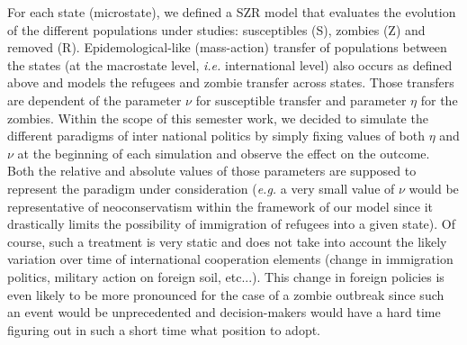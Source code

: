 \documentclass[11pt]{article} %
\begin{document}
For each state (microstate), we defined a SZR model that evaluates the evolution of the different populations under studies: susceptibles (S), zombies (Z) and removed (R). Epidemological-like (mass-action) transfer of populations between the states (at the macrostate level, \textit{i.e.} international level) also occurs as defined above and models the refugees and zombie transfer across states. Those transfers are dependent of the parameter $\nu$ for susceptible transfer and parameter $\eta$ for the zombies. Within the scope of this semester work, we decided to simulate the different paradigms of inter national politics by simply fixing values of both $\eta$ and $\nu$ at the beginning of each simulation and observe the effect on the outcome. Both the relative and absolute values of those parameters are supposed to represent the paradigm under consideration (\textit{e.g.} a very small value of $\nu$ would be representative of neoconservatism within the framework of our model since it drastically limits the possibility of immigration of refugees into a given state). Of course, such a treatment is very static and does not take into account the likely variation over time of  international cooperation elements (change in immigration politics, military action on foreign soil, etc...). This change in foreign policies is even likely to be more pronounced for the case of a zombie outbreak since such an event would be unprecedented and decision-makers would have a hard time figuring out in such a short time what position to adopt. 
\end{document}
